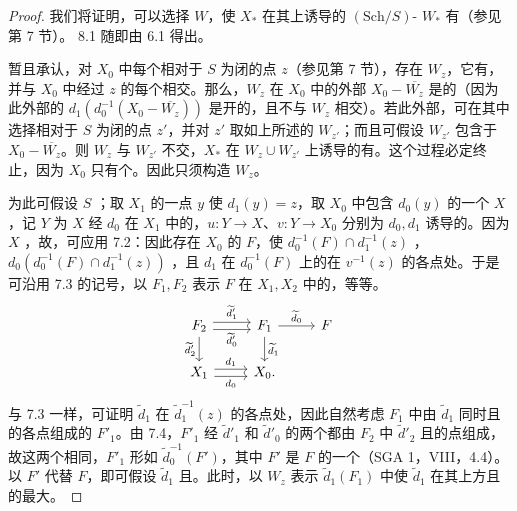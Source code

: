 \begin{proof}
我们将证明，可以选择 $W$，使 $X_*$ 在其上诱导的 $(\mathrm{Sch}/S)$- $W_*$ 有（参见第 7 节）。 8.1 随即由 6.1 得出。

暂且承认，对 $X_0$ 中每个相对于 $S$ 为闭的点 $z$（参见第 7 节），存在 $W_z$，它有，并与 $X_0$ 中经过 $z$ 的每个相交。那么，$W_z$ 在 $X_0$ 中的外部 $X_0-\overline{W_z}$ 是的（因为此外部的 $d_1(d_0^{-1}(X_0-\overline{W_z}))$ 是开的，且不与 $W_z$ 相交）。若此外部，可在其中选择相对于 $S$ 为闭的点 $z'$，并对 $z'$ 取如上所述的 $W_{z'}$；而且可假设 $W_{z'}$ 包含于 $X_0-\overline{W_z}$。则 $W_z$ 与 $W_{z'}$ 不交，$X_*$ 在 $W_z\cup W_{z'}$ 上诱导的有。这个过程必定终止，因为 $X_0$ 只有个。因此只须构造 $W_z$。

为此可假设 $S$ ；取 $X_1$ 的一点 $y$ 使 $d_1(y)=z$，取 $X_0$ 中包含 $d_0(y)$ 的一个 $X$，记 $Y$ 为 $X$ 经 $d_0$ 在 $X_1$ 中的，$u:Y\to X$、$v:Y\to X_0$ 分别为 $d_0,d_1$ 诱导的。因为 $X$ ，故，可应用 7.2：因此存在 $X_0$ 的 $F$，使 $d_0^{-1}(F)\cap d_1^{-1}(z)$ ，$d_0(d_0^{-1}(F)\cap d_1^{-1}(z))$ ，且 $d_1$ 在 $d_0^{-1}(F)$ 上的在 $v^{-1}(z)$ 的各点处。于是可沿用 7.3 的记号，以 $F_1,F_2$ 表示 $F$ 在 $X_1,X_2$ 中的，等等。
\[
\begin{tikzcd}
F_2\arrow[r,shift left=.6ex,"\widetilde d'_1"]\arrow[r,shift right=.6ex,"\widetilde d'_0"']\arrow[d,"\widetilde d'_2"']&F_1\arrow[r,"\widetilde d_0"]\arrow[d,"\widetilde d_1"]&F\\
X_1\arrow[r,shift left=.6ex,"d_1"]\arrow[r,shift right=.6ex,"d_0"']&X_0.&
\end{tikzcd}
\]
与 7.3 一样，可证明 $\widetilde d_1$ 在 $\widetilde d_1^{-1}(z)$ 的各点处，因此自然考虑 $F_1$ 中由 $\widetilde d_1$ 同时且的各点组成的 $F'_1$。由 7.4，$F'_1$ 经 $\widetilde d'_1$ 和 $\widetilde d'_0$ 的两个都由 $F_2$ 中 $\widetilde d'_2$ 且的点组成，
故这两个相同，$F'_1$ 形如 $\widetilde d_0^{-1}(F')$，其中 $F'$ 是 $F$ 的一个（SGA 1，VIII，4.4）。以 $F'$ 代替 $F$，即可假设 $\widetilde d_1$ 且。此时，以 $W_z$ 表示 $\widetilde d_1(F_1)$ 中使 $\widetilde d_1$ 在其上方且的最大。


\end{proof}
